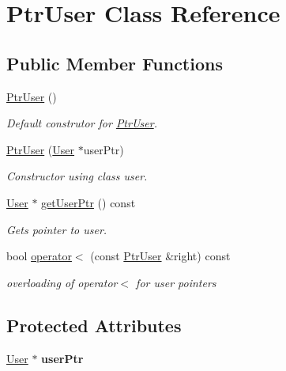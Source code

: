 \hypertarget{class_ptr_user}{}\section{Ptr\+User Class Reference}
\label{class_ptr_user}
\subsection*{Public Member Functions}
\begin{DoxyCompactItemize}
\item 
\hypertarget{class_ptr_user_ad2d9bc4f2b0822f11017d550a748cead}{}\hyperlink{class_ptr_user_ad2d9bc4f2b0822f11017d550a748cead}{Ptr\+User} ()\label{class_ptr_user_ad2d9bc4f2b0822f11017d550a748cead}

\begin{DoxyCompactList}\small\item\em Default construtor for \hyperlink{class_ptr_user}{Ptr\+User}. \end{DoxyCompactList}\item 
\hyperlink{class_ptr_user_a5107065e56842111d4da5fc601b74ca2}{Ptr\+User} (\hyperlink{class_user}{User} $\ast$user\+Ptr)
\begin{DoxyCompactList}\small\item\em Constructor using class user. \end{DoxyCompactList}\item 
\hyperlink{class_user}{User} $\ast$ \hyperlink{class_ptr_user_a3805e28de762dfc07d1563e5eab3f694}{get\+User\+Ptr} () const 
\begin{DoxyCompactList}\small\item\em Gets pointer to user. \end{DoxyCompactList}\item 
bool \hyperlink{class_ptr_user_ae074ce57b785860058ee35033dce17ca}{operator$<$} (const \hyperlink{class_ptr_user}{Ptr\+User} \&right) const 
\begin{DoxyCompactList}\small\item\em overloading of operator$<$ for user pointers \end{DoxyCompactList}\end{DoxyCompactItemize}
\subsection*{Protected Attributes}
\begin{DoxyCompactItemize}
\item 
\hypertarget{class_ptr_user_a6bab8fb2673a9f2d74f40b313ba7e4bc}{}\hyperlink{class_user}{User} $\ast$ {\bfseries user\+Ptr}\label{class_ptr_user_a6bab8fb2673a9f2d74f40b313ba7e4bc}

\end{DoxyCompactItemize}


